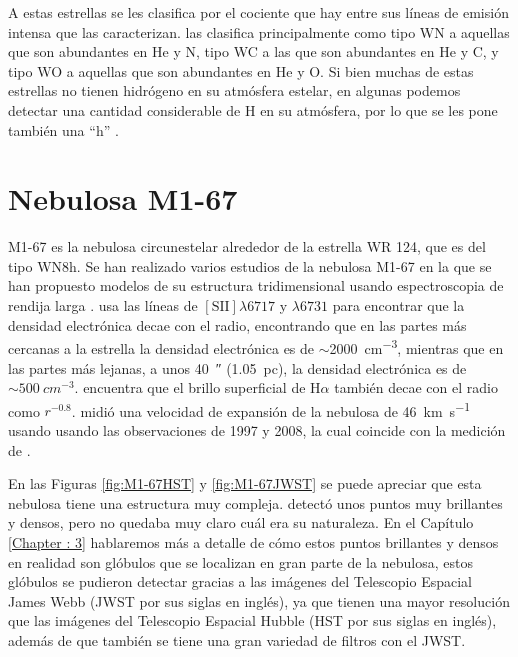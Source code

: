 \documentclass{book}
\begin{document}
A estas estrellas se les clasifica por el cociente que hay entre sus
líneas de emisión intensa que las caracterizan.
\cite{VanDerHutch:2001} las clasifica principalmente como tipo WN a
aquellas que son abundantes en He y N, tipo WC a las que son
abundantes en He y C, y tipo WO a aquellas que son abundantes en He y
O. Si bien muchas de estas estrellas no tienen hidrógeno en su
atmósfera estelar, en algunas podemos detectar una cantidad
considerable de H en su atmósfera, por lo que se les pone también una
``h'' \citep{SSM:1996}.


\section{Nebulosa M1-67}

M1-67 es la nebulosa circunestelar alrededor de la estrella WR 124,
que es del tipo WN8h. Se han realizado varios estudios de la nebulosa
M1-67 en la que se han propuesto modelos de su estructura
tridimensional usando espectroscopia de rendija larga
\citep{Zavala:2022}. \cite{Marcel:2021} usa las líneas de
$[\mathrm{S \scriptstyle{II}}]\lambda6717$ y $\lambda6731$ para encontrar que la
densidad electrónica decae con el radio, encontrando que en las partes
más cercanas a la estrella la densidad electrónica es de
$\sim$\SI{2000}{cm^{-3}}, mientras que en las partes más lejanas, a unos
\SI{40}{\arcsecond} (\SI{1.05}{pc}), la densidad electrónica es de
$\sim\SI{500}{cm^{-3}}$. \cite{Grosdidier:1998} encuentra que el brillo
superficial de H$\alpha$ también decae con el radio como $r^{-0.8}$.
\cite{Mancherko:2010} midió una velocidad de expansión de la nebulosa
de \SI{46}{km.s^{-1}} usando usando las observaciones de 1997
\citep{Grosdidier:1998} y 2008, la cual coincide con la medición de
\cite{Zavala:2022}.

En las Figuras \ref{fig:M1-67HST} y \ref{fig:M1-67JWST} se puede
apreciar que esta nebulosa tiene una estructura muy compleja.
\cite{Grosdidier:1998} detectó unos puntos muy brillantes y densos,
pero no quedaba muy claro cuál era su naturaleza. En el Capítulo
\ref{Chapter : 3} hablaremos más a detalle de cómo estos puntos
brillantes y densos en realidad son glóbulos que se localizan en gran
parte de la nebulosa, estos glóbulos se pudieron detectar gracias a
las imágenes del Telescopio Espacial James Webb (JWST por sus siglas
en inglés), ya que tienen una mayor resolución que las imágenes del
Telescopio Espacial Hubble (HST por sus siglas en inglés), además de
que también se tiene una gran variedad de filtros con el JWST.
\end{document}
